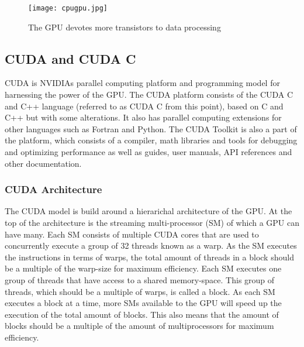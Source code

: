 \begin{figure}[h!]
\texttt{[image: cpugpu.jpg]}
\caption{The GPU devotes more transistors to data processing\cite{cuda_c_programming_guide}\label{cpugpu}}
\end{figure}


\subsection{CUDA and CUDA C}
CUDA is NVIDIAs parallel computing platform and programming model for harnessing the power of the GPU.
The CUDA platform consists of the CUDA C and C++ language (referred to as CUDA C from this point), based on C and C++ but with some alterations.
It also has parallel computing extensions for other languages such as Fortran and Python.
The CUDA Toolkit is also a part of the platform, which consists of a compiler, math libraries and tools for debugging and optimizing performance as well as guides, user manuals, API references and other documentation.

\subsubsection{CUDA Architecture}
The CUDA model is build around a hierarichal architecture of the GPU. 
At the top of the architecture is the streaming multi-processor (SM) of which a GPU can have many. 
Each SM consists of multiple CUDA cores that are used to concurrently execute a group of 32 threads known as a warp. As the SM executes the instructions in terms of warps, the total amount of threads in a block should be a multiple of the warp-size for maximum efficiency.
Each SM executes one group of threads that have access to a shared memory-space. This group of threads, which should be a multiple of warps, is called a block. 
As each SM executes a block at a time, more SMs available to the GPU will speed up the execution of the total amount of blocks. 
This also means that the amount of blocks should be a multiple of the amount of multiprocessors for maximum efficiency. %

